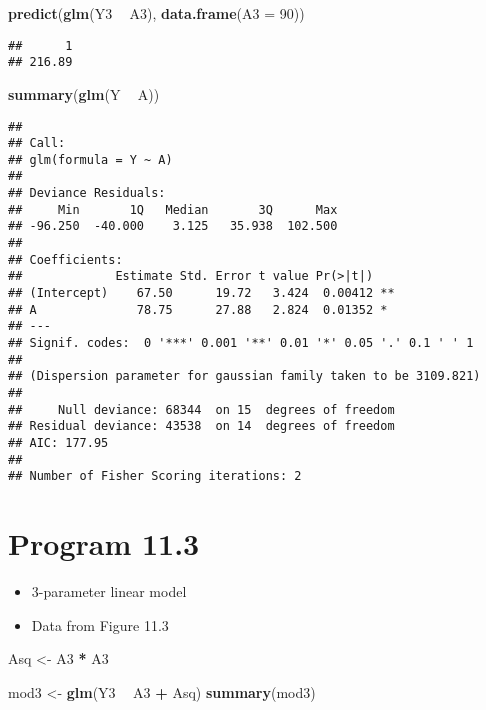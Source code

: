 \documentclass[10pt,]{book}
\newenvironment{Shaded}{\begin{snugshade}}{\end{snugshade}}
\newcommand{\DataTypeTok}[1]{\textcolor[rgb]{0.13,0.29,0.53}{#1}}
\newcommand{\DecValTok}[1]{\textcolor[rgb]{0.00,0.00,0.81}{#1}}
\newcommand{\KeywordTok}[1]{\textcolor[rgb]{0.13,0.29,0.53}{\textbf{#1}}}
\newcommand{\NormalTok}[1]{#1}
\newcommand{\OperatorTok}[1]{\textcolor[rgb]{0.81,0.36,0.00}{\textbf{#1}}}
\newcommand{\StringTok}[1]{\textcolor[rgb]{0.31,0.60,0.02}{#1}}
\providecommand{\tightlist}{%
  \setlength{\itemsep}{0pt}\setlength{\parskip}{0pt}}
\begin{document}
\begin{Shaded}
\begin{Highlighting}[]
\KeywordTok{predict}\NormalTok{(}\KeywordTok{glm}\NormalTok{(Y3 }\OperatorTok{~}\StringTok{ }\NormalTok{A3), }\KeywordTok{data.frame}\NormalTok{(}\DataTypeTok{A3 =} \DecValTok{90}\NormalTok{))}
\end{Highlighting}
\end{Shaded}

\begin{verbatim}
##      1 
## 216.89
\end{verbatim}

\begin{Shaded}
\begin{Highlighting}[]
\KeywordTok{summary}\NormalTok{(}\KeywordTok{glm}\NormalTok{(Y }\OperatorTok{~}\StringTok{ }\NormalTok{A))}
\end{Highlighting}
\end{Shaded}

\begin{verbatim}
## 
## Call:
## glm(formula = Y ~ A)
## 
## Deviance Residuals: 
##     Min       1Q   Median       3Q      Max  
## -96.250  -40.000    3.125   35.938  102.500  
## 
## Coefficients:
##             Estimate Std. Error t value Pr(>|t|)   
## (Intercept)    67.50      19.72   3.424  0.00412 **
## A              78.75      27.88   2.824  0.01352 * 
## ---
## Signif. codes:  0 '***' 0.001 '**' 0.01 '*' 0.05 '.' 0.1 ' ' 1
## 
## (Dispersion parameter for gaussian family taken to be 3109.821)
## 
##     Null deviance: 68344  on 15  degrees of freedom
## Residual deviance: 43538  on 14  degrees of freedom
## AIC: 177.95
## 
## Number of Fisher Scoring iterations: 2
\end{verbatim}

\hypertarget{program-11.3}{%
\section{Program 11.3}\label{program-11.3}}

\begin{itemize}
\tightlist
\item
  3-parameter linear model
\item
  Data from Figure 11.3
\end{itemize}

\begin{Shaded}
\begin{Highlighting}[]
\NormalTok{Asq <-}\StringTok{ }\NormalTok{A3 }\OperatorTok{*}\StringTok{ }\NormalTok{A3}

\NormalTok{mod3 <-}\StringTok{ }\KeywordTok{glm}\NormalTok{(Y3 }\OperatorTok{~}\StringTok{ }\NormalTok{A3 }\OperatorTok{+}\StringTok{ }\NormalTok{Asq)}
\KeywordTok{summary}\NormalTok{(mod3)}
\end{Highlighting}
\end{Shaded}
\end{document}
